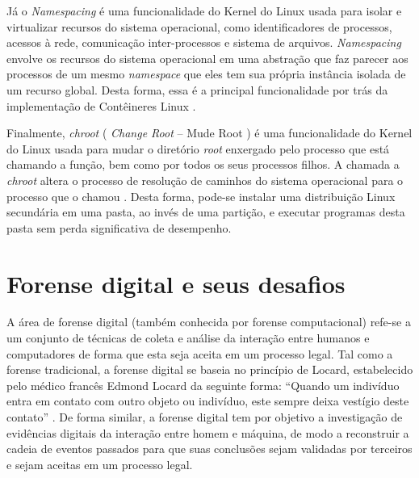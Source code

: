 Já o \textit{Namespacing} é uma funcionalidade do Kernel do Linux usada para isolar e virtualizar recursos do sistema operacional, como identificadores de processos, acessos à rede, comunicação inter-processos e sistema de arquivos.
%
\textit{Namespacing} envolve os recursos do sistema operacional em uma abstração que faz parecer aos processos de um mesmo \textit{namespace} que eles tem sua própria instância isolada de um recurso global.
%
Desta forma, essa é a principal funcionalidade por trás da implementação de Contêineres Linux \cite{UnixManPagesNamespacing}.


Finalmente, \textit{chroot} ( \textit{Change Root} -- Mude Root ) é uma funcionalidade do Kernel do Linux usada para mudar o diretório \textit{root} enxergado pelo processo que está chamando a função, bem como por todos os seus processos filhos. 
%
A chamada a \textit{chroot} altera o processo de resolução de caminhos do sistema operacional para o processo que o chamou \cite{UnixManPagesChRoot}.
%
Desta forma, pode-se instalar uma distribuição Linux secundária em uma pasta, ao invés de uma partição, e executar programas desta pasta sem perda significativa de desempenho.


\section{Forense digital e seus desafios}
\label{sec:forensedigital}


A área de forense digital (também conhecida por forense computacional) refe-se a um conjunto de técnicas de coleta e análise da interação entre humanos e computadores de forma que esta seja aceita em um processo legal.
%
Tal como a forense tradicional, a forense digital se baseia no princípio de Locard, estabelecido pelo médico francês Edmond Locard da seguinte forma: ``Quando um indivíduo entra em contato com outro objeto ou indivíduo, este sempre deixa vestígio deste contato'' \cite{Ramos:2011}.
%
De forma similar, a forense digital tem por objetivo a investigação de evidências digitais da interação entre homem e máquina, de modo a reconstruir a cadeia de eventos passados para que suas conclusões sejam validadas por terceiros e sejam aceitas em um processo legal.


